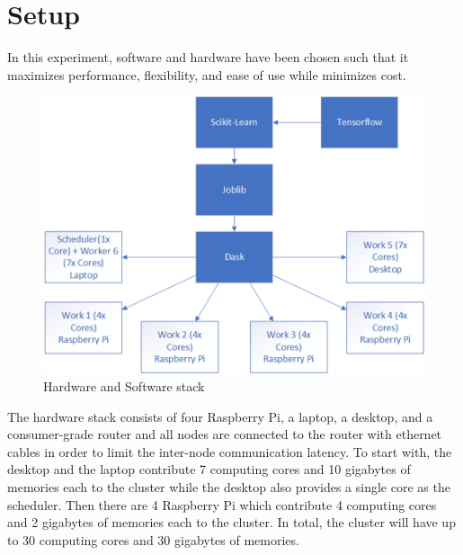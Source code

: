 \documentclass[conference]{IEEEtran}
\begin{document}
    \section{Setup}
        In this experiment, software and hardware have been chosen such that it maximizes performance, flexibility, and ease of use while minimizes cost. 
        
        \begin{figure}[!htb]
            \centering
            \captionsetup{justification=centering}
            \includegraphics[width=\linewidth]{Stack.png}
            \caption{Hardware and Software stack}  
        \end{figure}
            
        The hardware stack consists of four Raspberry Pi, a laptop, a desktop, and a consumer-grade router and all nodes are connected to the router with ethernet cables in order to limit the inter-node communication latency. To start with, the desktop and the laptop contribute 7 computing cores and 10 gigabytes of memories each to the cluster while the desktop also provides a single core as the scheduler. Then there are 4 Raspberry Pi which contribute 4 computing cores and 2 gigabytes of memories each to the cluster. In total, the cluster will have up to 30 computing cores and 30 gigabytes of memories.
\end{document}
